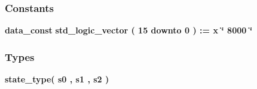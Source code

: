 \subsubsection*{Constants}
 \begin{DoxyCompactItemize}
\item 
{\bf data\+\_\+const} {\bfseries \textcolor{comment}{std\+\_\+logic\+\_\+vector}\textcolor{vhdlchar}{ }\textcolor{vhdlchar}{(}\textcolor{vhdlchar}{ }\textcolor{vhdlchar}{ } \textcolor{vhdldigit}{15} \textcolor{vhdlchar}{ }\textcolor{keywordflow}{downto}\textcolor{vhdlchar}{ }\textcolor{vhdlchar}{ } \textcolor{vhdldigit}{0} \textcolor{vhdlchar}{ }\textcolor{vhdlchar}{)}\textcolor{vhdlchar}{ }\textcolor{vhdlchar}{ }\textcolor{vhdlchar}{ }\textcolor{vhdlchar}{\+:}\textcolor{vhdlchar}{=}\textcolor{vhdlchar}{ }\textcolor{vhdlchar}{ }\textcolor{vhdlchar}{x}\textcolor{vhdlchar}{ }\textcolor{keyword}{\char`\"{} 8000 \char`\"{}}\textcolor{vhdlchar}{ }} 
\end{DoxyCompactItemize}
\subsubsection*{Types}
 \begin{DoxyCompactItemize}
\item 
{\bfseries {\bf state\+\_\+type}{\bfseries \textcolor{vhdlchar}{(}\textcolor{vhdlchar}{ }\textcolor{vhdlchar}{s0}\textcolor{vhdlchar}{ }\textcolor{vhdlchar}{,}\textcolor{vhdlchar}{ }\textcolor{vhdlchar}{s1}\textcolor{vhdlchar}{ }\textcolor{vhdlchar}{,}\textcolor{vhdlchar}{ }\textcolor{vhdlchar}{s2}\textcolor{vhdlchar}{ }\textcolor{vhdlchar}{)}\textcolor{vhdlchar}{ }}} 
\end{DoxyCompactItemize}
